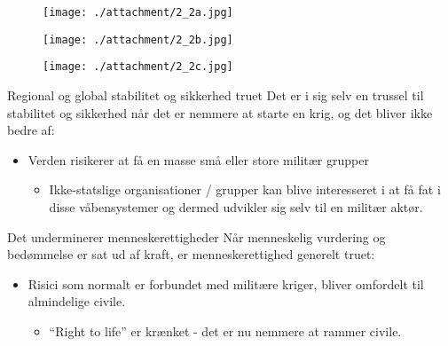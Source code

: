     \begin{frame}
        \begin{figure}
          \centering
          \texttt{[image: ./attachment/2\_2a.jpg]}
        \end{figure}
      \end{frame}
    \begin{frame}
        \begin{figure}
          \centering
          \texttt{[image: ./attachment/2\_2b.jpg]}
        \end{figure}
      \end{frame}
    \begin{frame}
        \begin{figure}
          \centering
          \texttt{[image: ./attachment/2\_2c.jpg]}
        \end{figure}
      \end{frame}

      \begin{frame}{Regional og global stabilitet og sikkerhed truet}
    Det er i sig selv en trussel til stabilitet og sikkerhed når det
    er nemmere at starte en krig, og det bliver ikke bedre af:
    \pause
    \begin{itemize}[<+->]
      \item Verden risikerer at få en masse små eller store militær
          grupper
        \begin{itemize}
        \item Ikke-statslige organisationer / grupper kan blive
        interesseret i at
        få fat i disse våbensystemer og dermed udvikler sig selv til
        en militær aktør.
          \end{itemize}
      \end{itemize}
    \end{frame}

    \begin{frame}{Det underminerer menneskerettigheder}
    Når menneskelig vurdering og bedømmelse er sat ud af kraft, er
    menneskerettighed generelt truet:
    \pause
    \begin{itemize}[<+->]
      \item Risici som normalt er forbundet med militære kriger,
        bliver omfordelt til almindelige civile.
        \begin{itemize}
        \item ``Right to life'' er krænket - det er nu nemmere at
          rammer civile.
          \end{itemize}
      \end{itemize}
    \end{frame}

